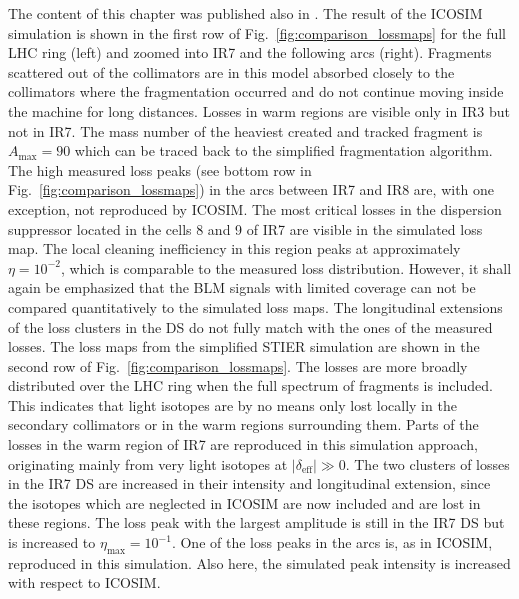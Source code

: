 The content of this chapter was published also in \cite{NIM:819}.
The result of the ICOSIM simulation is shown in the first row of Fig.~\ref{fig:comparison_lossmaps} for the full LHC ring (left) and zoomed into IR7 and the following arcs (right). Fragments scattered out of the collimators are in this model absorbed closely to the collimators where the fragmentation occurred and do not continue moving inside the machine for long distances. Losses in warm regions are visible only in IR3 but not in IR7. The mass number of the heaviest created and tracked fragment is $A_\text{max} = 90$ which can be traced back to the simplified fragmentation algorithm. The high measured loss peaks (see bottom row in Fig.~\ref{fig:comparison_lossmaps}) in the arcs between IR7 and IR8 are, with one exception, not reproduced by ICOSIM. The most critical losses in the dispersion suppressor located in the cells 8 and 9 of IR7 are visible in the simulated loss map. The local cleaning inefficiency in this region peaks at approximately $\eta=10^{-2}$, which is comparable to the measured loss distribution. However, it shall again be emphasized that the BLM signals with limited coverage can not be compared quantitatively to the simulated loss maps. The longitudinal extensions of the loss clusters in the DS do not fully match with the ones of the measured losses. 
%
%
The loss maps from the simplified STIER simulation are shown in the second row of Fig.~\ref{fig:comparison_lossmaps}. The losses are more broadly distributed over the LHC ring when the full spectrum of fragments is included. This indicates that light isotopes are by no means only lost locally in the secondary collimators or in the warm regions surrounding them. Parts of the losses in the warm region of IR7 are reproduced in this simulation approach, originating mainly from very light isotopes at $|\delta_\text{eff}|\gg0$. The two clusters of losses in the IR7 DS are increased in their intensity and longitudinal extension, since the isotopes which are neglected in ICOSIM are now included and are lost in these regions. The loss peak with the largest amplitude is still in the IR7 DS but is increased to \mbox{$\eta_\text{max} = 10^{-1}$}. One of the loss peaks in the arcs is, as in ICOSIM, reproduced in this simulation. Also here, the simulated peak intensity is increased with respect to ICOSIM.





